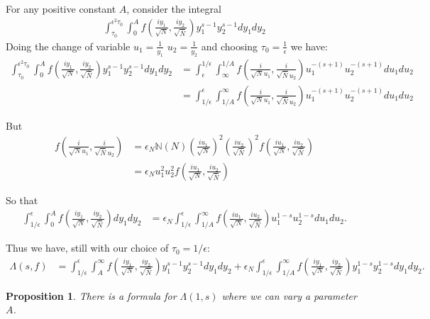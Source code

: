 \documentclass{article}
\theoremstyle{plain}
\newtheorem{proposition}{Proposition}
\begin{document}
For any positive constant $A$, consider the integral  
\begin{align*}
\int_{\tau_0}^{\epsilon^2 \tau_0}\int_{0}^{A} f\left(\frac{iy_1}{\sqrt{N}},\frac{iy_2}{\sqrt{\bar{N}}}\right) y_1^{s-1}y_2^{s-1} dy_1 dy_2 
\end{align*}
Doing the change of variable $u_1=\frac{1}{y_1}$ $u_2=\frac{1}{y_2}$ and choosing $\tau_0=\frac{1}{\epsilon}$ we have:
\begin{align*}
\int_{\tau_0}^{\epsilon^2 \tau_0}\int_{0}^{A} f\left(\frac{iy_1}{\sqrt{N}},\frac{iy_2}{\sqrt{\bar{N}}}\right) y_1^{s-1}y_2^{s-1} dy_1 dy_2 
&= \int_{\epsilon}^{1/\epsilon}\int_{\infty}^{1/A} f\left(\frac{i}{\sqrt{N}u_1},\frac{i}{\sqrt{\bar{N}}u_2}\right) u_1^{-(s+1)} u_2^{-(s+1)} du_1 du_2\\
&=  \int_{1/\epsilon}^{\epsilon}\int^{\infty}_{1/A} f\left(\frac{i}{\sqrt{N}u_1},\frac{i}{\sqrt{\bar{N}}u_2}\right) u_1^{-(s+1)} u_2^{-(s+1)} du_1 du_2
\end{align*}

But 
\begin{align*}
f\left(\frac{i}{\sqrt{N}u_1},\frac{i}{\sqrt{\bar{N}}u_2}\right)&= \epsilon_N \mathbb{N}(N)\left(\frac{iu_1}{\sqrt{N}}\right)^2\left(\frac{iu_2}{\sqrt{\bar{N}}}\right)^2 f\left(\frac{iu_1}{\sqrt{N}},\frac{iu_2}{\sqrt{\bar{N}}}\right)\\
&= \epsilon_N u_1^2 u_2^2 f\left(\frac{iu_1}{\sqrt{N}},\frac{iu_2}{\sqrt{\bar{N}}}\right)
\end{align*}

So that
\begin{align*}
\int_{1/\epsilon}^{\epsilon}\int_{0}^{A} f\left(\frac{iy_1}{\sqrt{N}},\frac{iy_2}{\sqrt{\bar{N}}}\right)  dy_1 dy_2&=
\epsilon_N \int_{1/\epsilon}^{\epsilon} \int_{1/A}^{\infty} f\left(\frac{iu_1}{\sqrt{N}},\frac{iu_2}{\sqrt{\bar{N}}}\right) u_1^{1-s}u_2^{1-s}du_1 du_2.
\end{align*}

Thus we have, still with our choice of $\tau_0=1/\epsilon$:
\begin{align}\label{niceformula}
\Lambda(s,f)&= \int_{1/\epsilon}^{\epsilon}\int_{A}^{\infty} f\left(\frac{iy_1}{\sqrt{N}},\frac{iy_2}{\sqrt{\bar{N}}}\right) y_1^{s-1}y_2^{s-1} dy_1 dy_2 + \epsilon_N \int_{1/\epsilon}^{\epsilon} \int_{1/A}^{\infty} f\left(\frac{iy_1}{\sqrt{N}},\frac{iy_2}{\sqrt{\bar{N}}}\right) y_1^{1-s}y_2^{1-s} dy_1 dy_2.
\end{align}

\begin{proposition}
There is a formula for $\Lambda(1,s)$ where we can vary a parameter $A$.
\end{proposition}
\end{document}
